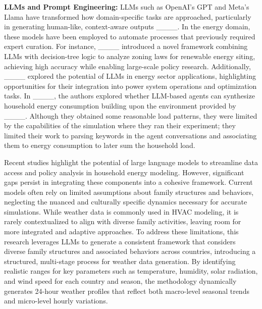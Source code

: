 {\bf LLMs and Prompt Engineering:} LLMs such as OpenAI’s GPT and Meta’s Llama have transformed how domain-specific tasks are approached, particularly in generating human-like, context-aware outputs ____. In the energy domain, these models have been employed to automate processes that previously required expert curation. For instance, ____ introduced a novel framework combining LLMs with decision-tree logic to analyze zoning laws for renewable energy siting, achieving high accuracy while enabling large-scale policy research. Additionally, ____ explored the potential of LLMs in energy sector applications, highlighting opportunities for their integration into power system operations and optimization tasks. In ____, the authors explored whether LLM-based agents can synthesize household energy consumption building upon the environment provided by ____. Although they obtained some reasonable load patterns, they were limited by the capabilities of the simulation where they ran their experiment; they limited their work to parsing keywords in the agent conversations and associating them to energy consumption to later sum the household load.

Recent studies highlight the potential of large language models to streamline data access and policy analysis in household energy modeling. However, significant gaps persist in integrating these components into a cohesive framework. Current models often rely on limited assumptions about family structures and behaviors, neglecting the nuanced and culturally specific dynamics necessary for accurate simulations. While weather data is commonly used in HVAC modeling, it is rarely contextualized to align with diverse family activities, leaving room for more integrated and adaptive approaches. To address these limitations, this research leverages LLMs to generate a consistent framework that considers diverse family structures and associated behaviors across countries, introducing a structured, multi-stage process for weather data generation. By identifying realistic ranges for key parameters such as temperature, humidity, solar radiation, and wind speed for each country and season, the methodology dynamically generates 24-hour weather profiles that reflect both macro-level seasonal trends and micro-level hourly variations.